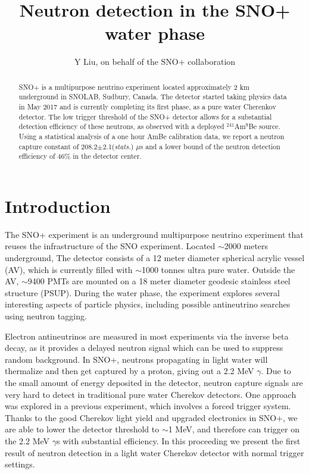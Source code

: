 \documentclass[a4paper]{jpconf}
\begin{document}
\title{Neutron detection in the SNO+ water phase}

\author{Y Liu, on behalf of the SNO+ collaboration}

\address{Department of Physics, Engineering Physics \& Astronomy, Queen's University, ON, Canada}


\begin{abstract}
SNO+ is a multipurpose neutrino experiment located approximately 2 km underground in SNOLAB, Sudbury, Canada. The detector started taking physics data in May 2017 and is currently completing its first phase, as a pure water Cherenkov detector. The low trigger threshold of the SNO+ detector allows for a substantial detection efficiency of these neutrons, as observed with a deployed $^{241}$Am$^{9}$Be source. Using a statistical analysis of a one hour AmBe calibration data, we report a neutron capture constant of 208.2$\pm$2.1(\textit{stats.}) $\mu$s and a lower bound of the neutron detection efficiency of 46\% in the detector center.
\end{abstract}

\section{Introduction}

The SNO+ experiment\cite{Andringa:2015tza} is an underground multipurpose neutrino experiment that reuses the infrastructure of the SNO experiment. Located $\sim$2000 meters underground, The detector consists of a 12 meter diameter spherical acrylic vessel (AV), which is currently filled with $\sim$1000 tonnes ultra pure water. Outside the AV, $\sim$9400 PMTs are mounted on a 18 meter diameter geodesic stainless steel structure (PSUP). During the water phase, the experiment explores several interesting aspects of particle physics, including possible antineutrino searches using neutron tagging.

Electron antineutrinos are measured in most experiments via the inverse beta decay, as it provides a delayed neutron signal which can be used to suppress random background. In SNO+, neutrons propagating in light water will thermalize and then get captured by a proton, giving out a 2.2 MeV $\gamma$. Due to the small amount of energy deposited in the detector, neutron capture signals are very hard to detect in traditional pure water Cherekov detectors. One approach\cite{Watanabe:2008ru} was explored in a previous experiment, which involves a forced trigger system. Thanks to the good Cherekov light yield and upgraded electronics in SNO+, we are able to lower the detector threshold to $\sim$1 MeV, and therefore can trigger on the 2.2 MeV $\gamma$s with substantial efficiency. In this proceeding we present the first result of neutron detection in a light water Cherekov detector with normal trigger settings. 
\end{document}
